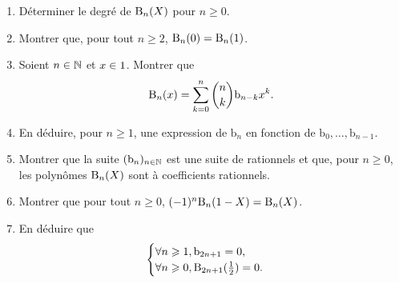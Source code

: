 \begin{exercice}
    \begin{enumerate}
        \item Déterminer le degré de $\mathrm{B}_n(X)$ pour $n \geqslant 0$. 
        \item Montrer que, pour tout $n \geqslant 2$, $\mathrm{B}_n(0) = \mathrm{B}_n(1)$.
        \item Soient $n \in \mathbb{N}$ et $x \in 1$. Montrer que 
        $$\mathrm{B}_n(x) = \sum_{k=0}^n \binom{n}{k} \mathrm{b}_{n-k} x^k.$$
        \item En déduire, pour $n \geqslant 1$, une expression de $\mathrm{b}_n$ en fonction de $\mathrm{b}_0, \dots, \mathrm{b}_{n-1}$.
        \item Montrer que la suite $(\mathrm{b}_n)_{n \in \mathbb{N}}$ est une suite de rationnels et que, pour $n \geqslant 0$, les polynômes $\mathrm{B}_n(X)$ sont à coefficients rationnels.
        \item Montrer que pour tout $n \geqslant 0$, $(-1)^n \mathrm{B}_n(1-X) = \mathrm{B}_n(X)$.
        \item En déduire que 
        $$
        \begin{cases}
            \forall n \geqslant 1, \mathrm{b}_{2n+1} = 0, \\
            \forall n \geqslant 0, \mathrm{B}_{2n+1}(\frac{1}{2}) = 0.
        \end{cases}
        $$
    \end{enumerate}    
\end{exercice}